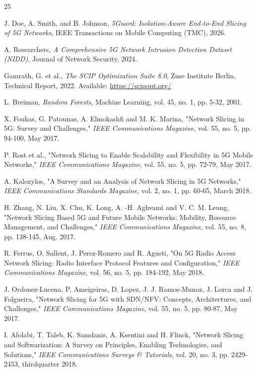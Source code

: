 \documentclass[12pt]{article}
\begin{document}
\begin{thebibliography}{25}

J. Doe, A. Smith, and B. Johnson, 
\textit{5Guard: Isolation-Aware End-to-End Slicing of 5G Networks}, 
IEEE Transactions on Mobile Computing (TMC), 2026.

A. Researchers, 
\textit{A Comprehensive 5G Network Intrusion Detection Dataset (NIDD)}, 
Journal of Network Security, 2024.

Gamrath, G. et al., 
\textit{The SCIP Optimization Suite 8.0}, 
Zuse Institute Berlin, Technical Report, 2022. 
Available: \url{https://scipopt.org/}

L. Breiman, 
\textit{Random Forests}, 
Machine Learning, vol. 45, no. 1, pp. 5-32, 2001.

X. Foukas, G. Patounas, A. Elmokashfi and M. K. Marina, 
"Network Slicing in 5G: Survey and Challenges," 
\textit{IEEE Communications Magazine}, vol. 55, no. 5, pp. 94-100, May 2017.

P. Rost et al., 
"Network Slicing to Enable Scalability and Flexibility in 5G Mobile Networks," 
\textit{IEEE Communications Magazine}, vol. 55, no. 5, pp. 72-79, May 2017.

A. Kaloxylos, 
"A Survey and an Analysis of Network Slicing in 5G Networks," 
\textit{IEEE Communications Standards Magazine}, vol. 2, no. 1, pp. 60-65, March 2018.

H. Zhang, N. Liu, X. Chu, K. Long, A. -H. Aghvami and V. C. M. Leung, 
"Network Slicing Based 5G and Future Mobile Networks: Mobility, Resource Management, and Challenges," 
\textit{IEEE Communications Magazine}, vol. 55, no. 8, pp. 138-145, Aug. 2017.

R. Ferrus, O. Sallent, J. Perez-Romero and R. Agusti, 
"On 5G Radio Access Network Slicing: Radio Interface Protocol Features and Configuration," 
\textit{IEEE Communications Magazine}, vol. 56, no. 5, pp. 184-192, May 2018.

J. Ordonez-Lucena, P. Ameigeiras, D. Lopez, J. J. Ramos-Munoz, J. Lorca and J. Folgueira, 
"Network Slicing for 5G with SDN/NFV: Concepts, Architectures, and Challenges," 
\textit{IEEE Communications Magazine}, vol. 55, no. 5, pp. 80-87, May 2017.

I. Afolabi, T. Taleb, K. Samdanis, A. Ksentini and H. Flinck, 
"Network Slicing and Softwarization: A Survey on Principles, Enabling Technologies, and Solutions," 
\textit{IEEE Communications Surveys \& Tutorials}, vol. 20, no. 3, pp. 2429-2453, thirdquarter 2018.


\end{thebibliography}
\end{document}
